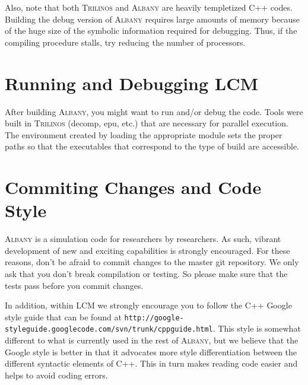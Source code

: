 \documentclass{article}
\newcommand{\trilinos}{\textsc{Trilinos}}
\newcommand{\albany}{\textsc{Albany}}
\newcommand{\lcm}{\textsc{LCM}}
\begin{document}
Also, note that both \trilinos{} and \albany{} are heavily templetized
C++ codes. Building the debug version of \albany{} requires large
amounts of memory because of the huge size of the symbolic information
required for debugging. Thus, if the compiling procedure stalls, try
reducing the number of processors.

\section{Running and Debugging \lcm{}} 

After building \albany{}, you might want to run and/or debug the code.
Tools were built in \trilinos{} (decomp, epu, etc.) that are necessary
for parallel execution. The environment created by loading the
appropriate module sets the proper paths so that the executables that
correspond to the type of build are accessible.

\section{Commiting Changes and Code Style}
\albany{} is a simulation code for researchers by researchers. As
such, vibrant development of new and exciting capabilities is strongly
encouraged. For these reasons, don't be afraid to commit changes to
the master git repository. We only ask that you don't break
compilation or testing. So please make sure that the tests pass before
you commit changes.

In addition, within \lcm{} we strongly encourage you to follow the C++
Google style guide that can be found at
\verb+http://google-styleguide.googlecode.com/svn/trunk/cppguide.html+.
This style is somewhat different to what is currently used in the rest
of \albany{}, but we believe that the Google style is better in that
it advocates more style differentiation between the different
syntactic elements of C++. This in turn makes reading code easier and
helps to avoid coding errors.
\end{document}

